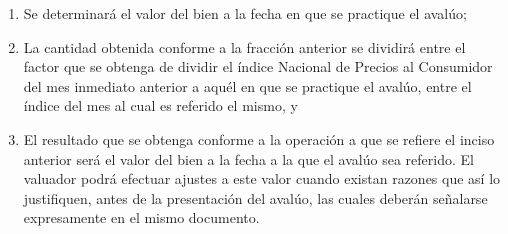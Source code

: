 \begin{enumerate}[\indent a)]

\item Se determinar\'a el valor del bien a la fecha en que se practique el aval\'uo; 
\item La cantidad obtenida conforme a la fracci\'on anterior se dividir\'a entre el factor que se obtenga de dividir el \'indice Nacional de Precios al Consumidor del mes inmediato anterior a aqu\'el en que se practique el aval\'uo, entre el \'indice del mes al cual es referido el mismo, y 
\item El resultado que se obtenga conforme a la operaci\'on a que se refiere el inciso anterior ser\'a el valor del bien a la fecha a la que el aval\'uo sea referido. El valuador podr\'a efectuar ajustes a este valor cuando existan razones que as\'i lo justifiquen, antes de la presentaci\'on del aval\'uo, las cuales deber\'an se\~nalarse expresamente en el mismo documento. 

\end{enumerate}

